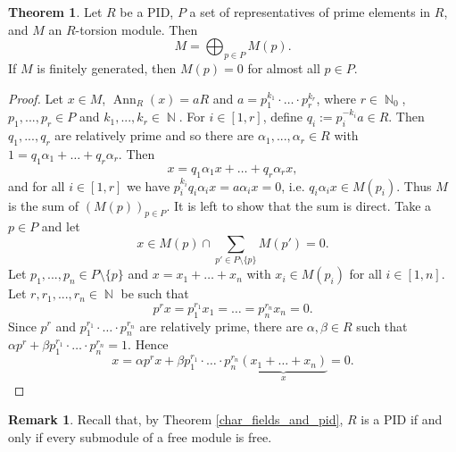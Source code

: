 \documentclass[12pt,a4paper]{report}
\theoremstyle{definition}
\newtheorem{theorem}{Theorem}[chapter] %
\newtheorem*{remark}{Remark}
\theoremstyle{num.custom-title}
\DeclareMathOperator{\Ann}{Ann}
\DeclareMathOperator{\N}{\mathbb{N}}
\DeclareMathOperator{\sm}{\setminus}
\begin{document}
\begin{theorem}
Let $R$ be a PID, $P$ a set of representatives of prime elements in $R$, and $M$ an $R$-torsion module. Then
\[
M = \bigoplus_{p \in P} M(p).
\]
If $M$ is finitely generated, then $M(p)=0$ for almost all $p \in P$.
\begin{proof}
Let $x \in M$, $\Ann_R(x)=aR$ and $a=p_1^{k_1} \cdot \ldots \cdot p_r^{k_r}$, where $r \in \N_0$, $p_1,...,p_r \in P$ and $k_1,...,k_r \in \N$. For $i \in [1,r]$, define $q_i := p_i^{-k_i} a \in R$. Then $q_1,...,q_r$ are relatively prime and so there are $\alpha_1,...,\alpha_r \in R$ with $1=q_1\alpha_1 + \ldots + q_r \alpha_r$. Then 
\[
x=q_1 \alpha_1 x + \ldots + q_r \alpha_r x,
\]
and for all $i \in [1,r]$ we have $p_i^{k_i} q_i \alpha_i x = a \alpha_i x = 0$, i.e. $q_i \alpha_i x \in M(p_i)$. Thus $M$ is the sum of $(M(p))_{p \in P}$. It is left to show that the sum is direct. Take a $p \in P$ and let
\[
x \in M(p) \cap \sum_{p' \in P \sm \{p\}} M(p') = 0.
\]
Let $p_1,...,p_n \in P \sm \{p\}$ and $x=x_1+\ldots+x_n$ with $x_i \in M(p_i)$ for all $i \in [1,n]$. Let $r,r_1,...,r_n \in \N$ be such that
\[
p^r x = p_1^{r_1} x_1 = \ldots = p_n^{r_n} x_n = 0.
\]
Since $p^r$ and $p_1^{r_1} \cdot \ldots \cdot p_n^{r_n}$ are relatively prime, there are $\alpha, \beta \in R$ such that $\alpha p^r + \beta p_1^{r_1} \cdot \ldots \cdot p_n^{r_n} = 1$. Hence
\[
x = \alpha p^r x + \beta p_1^{r_1} \cdot \ldots \cdot p_n^{r_n} \underbrace{(x_1+\ldots+x_n)}_{x} = 0.
\]
\end{proof}
\end{theorem}

\begin{remark}
Recall that, by Theorem \ref{char_fields_and_pid}, $R$ is a PID if and only if every submodule of a free module is free.
\end{remark}
\end{document}
